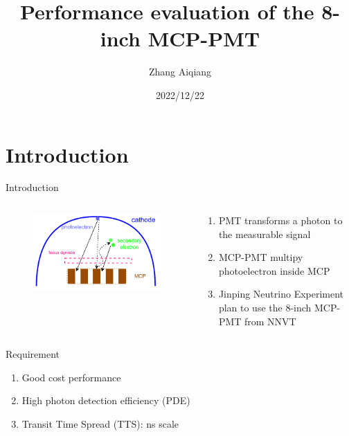 \documentclass[aspectratio=169]{beamer}
\title{Performance evaluation of the 8-inch MCP-PMT}
\author{Zhang Aiqiang}
\institute{Tsinghua University}
\date{2022/12/22}
\begin{document}
\begin{frame}[noframenumbering]
    \titlepage
\end{frame}
\begin{frame}[noframenumbering]
    \tableofcontents
\end{frame}
\section{Introduction}
\begin{frame}{Introduction}
    \begin{columns}
        \begin{column}{0.4\textwidth}
            \begin{figure}
                \includegraphics[width=\columnwidth]{../figures/method/MCPelectron.pdf}
            \end{figure}
        \end{column}
        \begin{column}{0.6\textwidth}
            \begin{enumerate}
                \item PMT transforms a photon to the measurable signal
                \item MCP-PMT multipy photoelectron inside MCP
                \item Jinping Neutrino Experiment plan to use the 8-inch MCP-PMT from NNVT
            \end{enumerate}
        \end{column}
    \end{columns}
    \begin{block}{Requirement}
        \begin{enumerate}
            \item Good cost performance
            \item High photon detection efficiency (PDE)
            \item Transit Time Spread (TTS): ns scale
        \end{enumerate}
    \end{block}
\end{frame}
\end{document}
